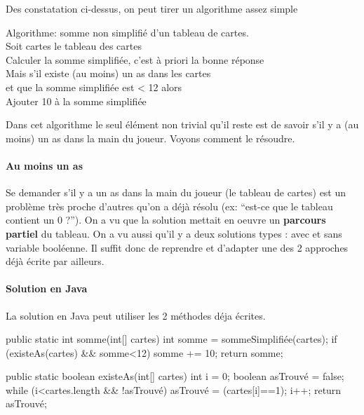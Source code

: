 Des constatation ci-dessus, on peut tirer un algorithme assez simple

\begin{langagenaturel}
Algorithme: somme non simplifié d'un tableau de cartes.\\

Soit cartes le tableau des cartes\\
Calculer la somme simplifiée, c'est à priori la bonne réponse\\
Mais s'il existe (au moins) un as dans les cartes \\
		\tab\tab\tab et que la somme simplifiée est < 12 alors\\
    \tab Ajouter 10 à la somme simplifiée\\
\end{langagenaturel}

Dans cet algorithme le seul élément non trivial qu'il reste est de savoir
s'il y a (au moins) un as dans la main du joueur. Voyons comment le
résoudre.

\paragraph{Au moins un as}

Se demander s'il y a un as dans la main du joueur (le tableau de cartes)
est un problème très proche d'autres qu'on a déjà résolu (ex: ``est-ce
que le tableau contient un 0 ?''). On a vu que la solution mettait en
oeuvre un \textbf{parcours partiel} du tableau. On a vu aussi qu'il y a
deux solutions types : avec et sans variable booléenne. Il suffit donc
de reprendre et d'adapter une des 2 approches déjà écrite par ailleurs.

\paragraph{Solution en Java}

La solution en Java peut utiliser les 2 méthodes déja écrites.

\begin{java}
public static int somme(int[] cartes) {
    int somme = sommeSimplifiée(cartes);
    if (existeAs(cartes) && somme<12) {
        somme += 10;
    }
    return somme;
}

public static boolean existeAs(int[] cartes) {
    int i = 0;
    boolean asTrouvé = false;
    while (i<cartes.length && !asTrouvé) {
        asTrouvé = (cartes[i]==1);
        i++;
    }
    return asTrouvé;
}
\end{java}

